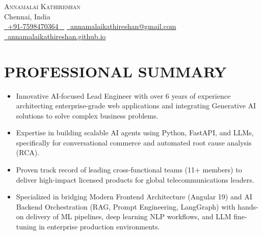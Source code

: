 \documentclass[letterpaper,10pt]{article}
\newcommand{\resumeItem}[1]{
  \item\small{
    {#1 \vspace{-2pt}}
  }
}
\newcommand{\resumeSubHeadingListStart}{\begin{itemize}[leftmargin=0.0in, label={}]}
\newcommand{\resumeSubHeadingListEnd}{\end{itemize}}
\begin{document}


\begin{center}
    {\Huge \scshape Annamalai Kathireshan} \\ \vspace{1pt}
    Chennai, India \\ \vspace{1pt}
    \small \href{tel:+917598470364}{ \raisebox{-0.1\height}\faPhone\ \underline{+91-7598470364} ~} \href{mailto:annamalaikathireshan@gmail.com}{\raisebox{-0.2\height}\faEnvelope\  \underline{annamalaikathireshan@gmail.com}} ~
    \href{https://annamalaikathireshan.github.io/Portfolio/ai}{\raisebox{-0.2\height}\faGlobe\ \underline{annamalaikathireshan.github.io}}  ~

    \vspace{-8pt}
\end{center}


\section{PROFESSIONAL SUMMARY}
\resumeSubHeadingListStart
\resumeItem{Innovative {AI-focused Lead Engineer} with over 6 years of experience architecting enterprise-grade web applications and integrating {Generative AI} solutions to solve complex business problems.}
\resumeItem{Expertise in building scalable AI agents using {Python, FastAPI, and LLMs}, specifically for conversational commerce and automated root cause analysis (RCA).}
\resumeItem{Proven track record of leading cross-functional teams (11+ members) to deliver high-impact licensed products for global telecommunications leaders.}
\resumeItem{Specialized in bridging {Modern Frontend Architecture (Angular 19)} and {AI Backend Orchestration (RAG, Prompt Engineering, LangGraph)} with hands-on delivery of {ML pipelines, deep learning NLP workflows, and LLM fine-tuning} in enterprise production environments.}
\resumeSubHeadingListEnd

\end{document}
